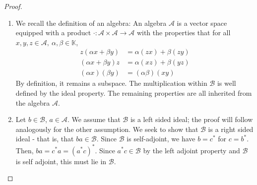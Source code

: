 \begin{proof}
\begin{enumerate}
	\item We recall the definition of an algebra: An algebra $\mathcal{A}$ is a vector space equipped with a product $\cdot: \mathcal{A}\times \mathcal{A}\to \mathcal{A}$ with the properties that for all $x,y,z\in \mathcal{A},~\alpha,\beta\in \mathbb{K}$, 
		\begin{align*}
			z(\alpha x + \beta y) &= \alpha(zx)+\beta(zy) \\
			(\alpha x + \beta y)z &= \alpha(xz) + \beta(yz) \\
			(\alpha x)(\beta y) &= (\alpha\beta)(xy)
		\end{align*}
		By definition, it remains a subspace. The multiplication within $\mathcal{B}$ is well defined by the ideal property. The remaining properties are all inherited from the algebra $\mathcal{A}$. 
	\item Let $b\in \mathcal{B}$, $a\in \mathcal{A}$. We assume that $\mathcal{B}$ is a left sided ideal; the proof will follow analogously for the other assumption. We seek to show that $\mathcal{B}$ is a right sided ideal - that is, that $ba\in \mathcal{B}$. Since $\mathcal{B}$ is self-adjoint, we have $b=c^*$ for $c= b^*$. Then, $ba = c^* a = (a^* c)^*$. Since $a^* c\in \mathcal{B}$ by the left adjoint property and $\mathcal{B}$ is self adjoint, this must lie in $\mathcal{B}$. \qedhere 
\end{enumerate}
\end{proof}


